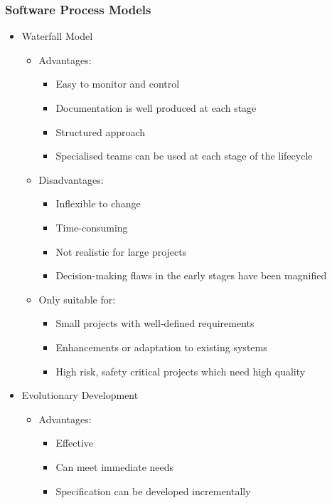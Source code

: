 \documentclass[12pt,openany]{book}
\begin{document}
\subsubsection{Software Process Models}
\begin{itemize}
    \item Waterfall Model
    \begin{itemize}
        \item Advantages:
        \begin{itemize}
            \item Easy to monitor and control
            \item Documentation is well produced at each stage
            \item Structured approach
            \item Specialised teams can be used at each stage of the lifecycle
        \end{itemize}
        \item Disadvantages:
        \begin{itemize}
            \item Inflexible to change
            \item Time-consuming
            \item Not realistic for large projects
            \item Decision-making flaws in the early stages have been magnified
        \end{itemize}
        \item Only suitable for:
        \begin{itemize}
            \item Small projects with well-defined requirements
            \item Enhancements or adaptation to existing systems
            \item High risk, safety critical projects which need high quality
        \end{itemize}
    \end{itemize}
    \item Evolutionary Development
    \begin{itemize}
        \item Advantages:
        \begin{itemize}
            \item Effective
            \item Can meet immediate needs
            \item Specification can be developed incrementally

\end{itemize}
\end{itemize}
\end{itemize}
\end{document}
